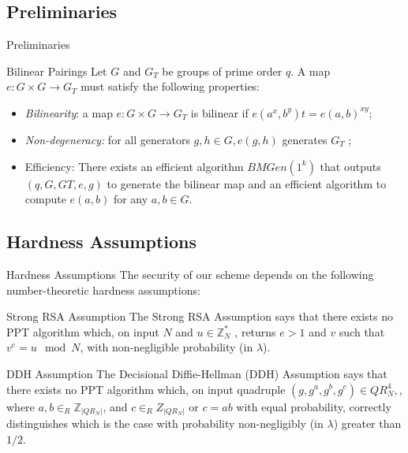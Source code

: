 \documentclass[
	xcolor={svgnames},
	hyperref={pagebackref,bookmarks},
	aspectratio=43,
]{beamer}
\begin{document}
\subsection{Preliminaries}
\begin{frame}{Preliminaries}
	\begin{block}{Bilinear Pairings}
		Let $G$ and $G_T$ be groups of prime order $q$. A map $e : G \times G \rightarrow G_T$ must satisfy the following properties:
		\begin{itemize}
			\item \textit{Bilinearity}: a map $e : G \times G \rightarrow G_T$ is bilinear if $e(a^x, b^y)t = e(a, b)^{xy}$;
			\item \textit{Non-degeneracy:} for all generators $g, h \in G, e(g, h)$ generates $G_T$ ;
			\item Efficiency: There exists an efficient algorithm $BMGen(1^k)$ that outputs $(q, G, GT , e, g)$ to generate the bilinear map and an efficient algorithm to compute $e(a, b)$ for any $a, b \in G$.
		\end{itemize}
	\end{block}
\end{frame}

\subsection*{Hardness Assumptions}
\begin{frame}{Hardness Assumptions}
	The security of our scheme depends on the following number-theoretic hardness assumptions:
	\begin{block}{Strong RSA Assumption}
		The Strong RSA Assumption says that there exists no PPT algorithm which, on input $N$ and $u \in \mathbb{Z}_N^* $ , returns $e > 1$ and $v$ such that $v^ e = u \mod N$, with non-negligible probability (in $\lambda$).
	\end{block}
	\begin{block}{DDH Assumption}
		The Decisional Diffie-Hellman (DDH) Assumption says that there exists no PPT algorithm which, on input quadruple $(g, g^a, g^b, g^c) \in QR_N^4,$, where $a, b \in_R \mathbb{Z}_{|QR_N |}$, and $c \in_R Z_{|QR_N|}$ or $c = ab$ with equal probability, correctly distinguishes which is the case with probability non-negligibly (in $\lambda$) greater than $1/2$.
	\end{block}
\end{frame}
\end{document}
